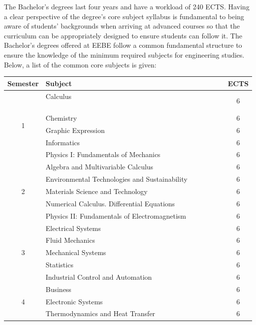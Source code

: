 \documentclass{article}
\begin{document}
The Bachelor's degrees last four years and have a workload of 240 ECTS. Having a clear perspective of the degree's core subject syllabus is fundamental to being aware of students' backgrounds when arriving at advanced courses so that the curriculum can be appropriately designed to ensure students can follow it. The Bachelor's degrees offered at EEBE follow a common fundamental structure to ensure the knowledge of the minimum required subjects for engineering studies. Below, a list of the common core subjects is given: 

\begin{tabular}{c l c }
 {\bf Semester}       & {\bf Subject}             & {\bf ECTS}  \\ 
 \hline
 \multirow{5}{*}{1}   & Calculus  $\quad\quad\quad\quad\quad\quad\quad\quad\quad\quad\quad\quad\quad\quad\quad\quad\quad\quad\quad\quad\quad\quad\quad\quad\quad$                                    & 6 \\ 
                      & Chemistry                                     & 6 \\
                      & Graphic Expression                            & 6 \\
                      & Informatics                                   & 6 \\
                      & Physics I: Fundamentals of Mechanics          & 6 \\                     
\hline
 \multirow{5}{*}{2}   & Algebra and Multivariable Calculus            & 6 \\  
                      & Environmental Technologies and Sustainability & 6 \\
                      & Materials Science and Technology              & 6 \\
                      & Numerical Calculus. Differential Equations    & 6 \\   
                      & Physics II: Fundamentals of Electromagnetism  & 6 \\ 
\hline
 \multirow{5}{*}{3}   & Electrical Systems                            & 6 \\  
                      & Fluid Mechanics                               & 6 \\
                      & Mechanical Systems                            & 6 \\
                      & Statistics                                    & 6 \\   
                      & Industrial Control and Automation             & 6 \\  

\hline
 \multirow{3}{*}{4}   & Business                                      & 6 \\  
                      & Electronic Systems                            & 6 \\  
                      & Thermodynamics and Heat Transfer              & 6 \\   
\hline
\end{tabular}
\end{document}
